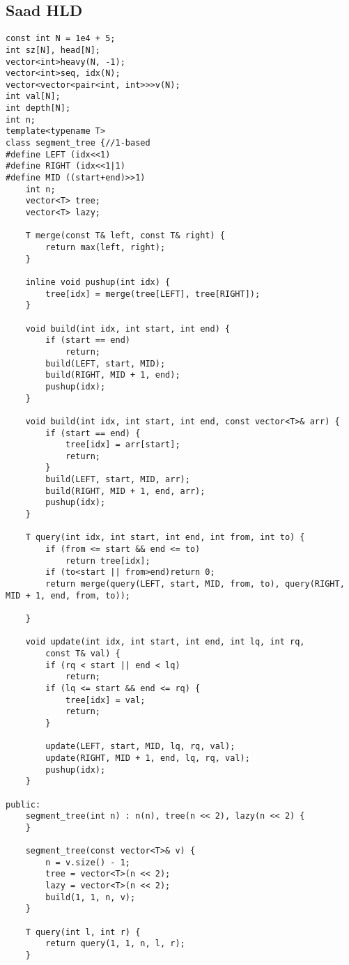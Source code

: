 \documentclass{article}
\begin{document}
\subsection{Saad HLD}
\begin{verbatim}
const int N = 1e4 + 5;
int sz[N], head[N];
vector<int>heavy(N, -1);
vector<int>seq, idx(N);
vector<vector<pair<int, int>>>v(N);
int val[N];
int depth[N];
int n;
template<typename T>
class segment_tree {//1-based
#define LEFT (idx<<1)
#define RIGHT (idx<<1|1)
#define MID ((start+end)>>1)
    int n;
    vector<T> tree;
    vector<T> lazy;

    T merge(const T& left, const T& right) {
        return max(left, right);
    }

    inline void pushup(int idx) {
        tree[idx] = merge(tree[LEFT], tree[RIGHT]);
    }

    void build(int idx, int start, int end) {
        if (start == end)
            return;
        build(LEFT, start, MID);
        build(RIGHT, MID + 1, end);
        pushup(idx);
    }

    void build(int idx, int start, int end, const vector<T>& arr) {
        if (start == end) {
            tree[idx] = arr[start];
            return;
        }
        build(LEFT, start, MID, arr);
        build(RIGHT, MID + 1, end, arr);
        pushup(idx);
    }

    T query(int idx, int start, int end, int from, int to) {
        if (from <= start && end <= to)
            return tree[idx];
        if (to<start || from>end)return 0;
        return merge(query(LEFT, start, MID, from, to), query(RIGHT, MID + 1, end, from, to));
        
    }

    void update(int idx, int start, int end, int lq, int rq,
        const T& val) {
        if (rq < start || end < lq)
            return;
        if (lq <= start && end <= rq) {
            tree[idx] = val;
            return;
        }
       
        update(LEFT, start, MID, lq, rq, val);
        update(RIGHT, MID + 1, end, lq, rq, val);
        pushup(idx);
    }

public:
    segment_tree(int n) : n(n), tree(n << 2), lazy(n << 2) {
    }

    segment_tree(const vector<T>& v) {
        n = v.size() - 1;
        tree = vector<T>(n << 2);
        lazy = vector<T>(n << 2);
        build(1, 1, n, v);
    }

    T query(int l, int r) {
        return query(1, 1, n, l, r);
    }


\end{verbatim}
\end{document}
